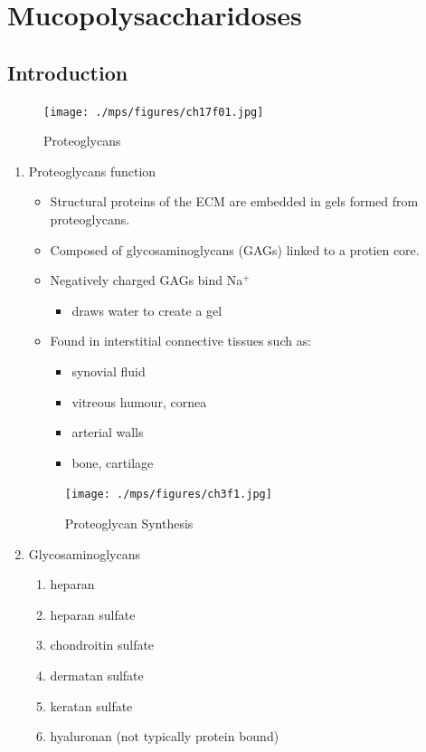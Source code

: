 \documentclass{scrartcl}
\begin{document}
\section{Mucopolysaccharidoses}
\label{sec:org01fbd8b}
\subsection{Introduction}
\label{sec:org5e422fb}
\begin{figure}[htbp]
\centering
\texttt{[image: ./mps/figures/ch17f01.jpg]}
\caption[Proteoglycans]{\label{fig:org401ae6c}
Proteoglycans}
\end{figure}

\begin{enumerate}
\item Proteoglycans function
\label{sec:orgc192b0c}

\begin{itemize}
\item Structural proteins of the ECM are embedded in gels formed from
proteoglycans.
\item Composed of glycosaminoglycans (GAGs) linked to a protien core.
\item Negatively charged GAGs bind Na\(^{\text{+}}\)
\begin{itemize}
\item draws water to create a gel
\end{itemize}
\item Found in interstitial connective tissues such as: 
\begin{itemize}
\item synovial fluid
\item vitreous humour, cornea
\item arterial walls
\item bone, cartilage
\end{itemize}
\end{itemize}

\begin{figure}[htbp]
\centering
\texttt{[image: ./mps/figures/ch3f1.jpg]}
\caption[Proteoglycan Synthesis]{\label{fig:org022ac2c}
Proteoglycan Synthesis}
\end{figure}


\item Glycosaminoglycans
\label{sec:org9b19c08}

\begin{enumerate}
\item heparan
\item heparan sulfate
\item chondroitin sulfate
\item dermatan sulfate
\item keratan sulfate
\item hyaluronan (not typically protein bound)
\end{enumerate}



\end{enumerate}
\end{document}
